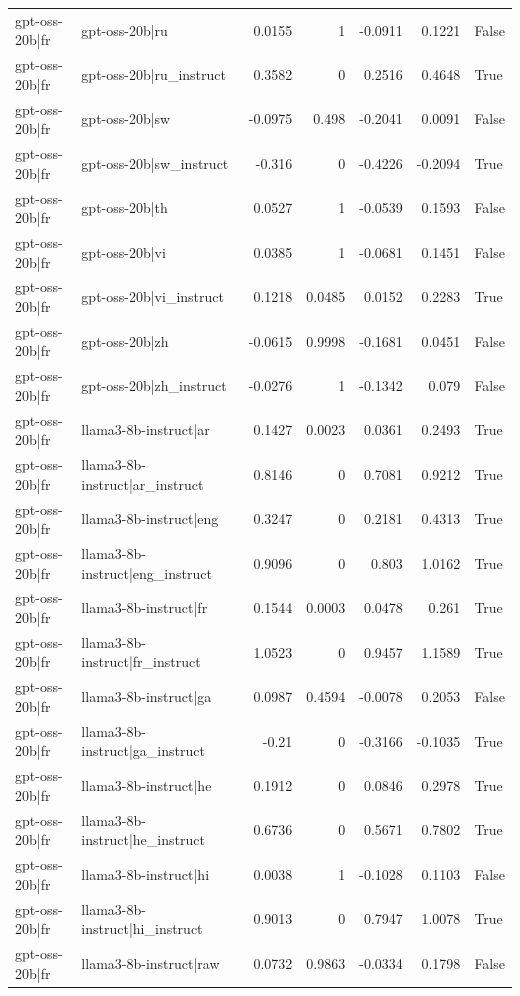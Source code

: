 \begin{table}
\begin{tabular}{l l r r r r l}
gpt-oss-20b|fr & gpt-oss-20b|ru & 0.0155 & 1 & -0.0911 & 0.1221 & False \\
gpt-oss-20b|fr & gpt-oss-20b|ru_instruct & 0.3582 & 0 & 0.2516 & 0.4648 & True \\
gpt-oss-20b|fr & gpt-oss-20b|sw & -0.0975 & 0.498 & -0.2041 & 0.0091 & False \\
gpt-oss-20b|fr & gpt-oss-20b|sw_instruct & -0.316 & 0 & -0.4226 & -0.2094 & True \\
gpt-oss-20b|fr & gpt-oss-20b|th & 0.0527 & 1 & -0.0539 & 0.1593 & False \\
gpt-oss-20b|fr & gpt-oss-20b|vi & 0.0385 & 1 & -0.0681 & 0.1451 & False \\
gpt-oss-20b|fr & gpt-oss-20b|vi_instruct & 0.1218 & 0.0485 & 0.0152 & 0.2283 & True \\
gpt-oss-20b|fr & gpt-oss-20b|zh & -0.0615 & 0.9998 & -0.1681 & 0.0451 & False \\
gpt-oss-20b|fr & gpt-oss-20b|zh_instruct & -0.0276 & 1 & -0.1342 & 0.079 & False \\
gpt-oss-20b|fr & llama3-8b-instruct|ar & 0.1427 & 0.0023 & 0.0361 & 0.2493 & True \\
gpt-oss-20b|fr & llama3-8b-instruct|ar_instruct & 0.8146 & 0 & 0.7081 & 0.9212 & True \\
gpt-oss-20b|fr & llama3-8b-instruct|eng & 0.3247 & 0 & 0.2181 & 0.4313 & True \\
gpt-oss-20b|fr & llama3-8b-instruct|eng_instruct & 0.9096 & 0 & 0.803 & 1.0162 & True \\
gpt-oss-20b|fr & llama3-8b-instruct|fr & 0.1544 & 0.0003 & 0.0478 & 0.261 & True \\
gpt-oss-20b|fr & llama3-8b-instruct|fr_instruct & 1.0523 & 0 & 0.9457 & 1.1589 & True \\
gpt-oss-20b|fr & llama3-8b-instruct|ga & 0.0987 & 0.4594 & -0.0078 & 0.2053 & False \\
gpt-oss-20b|fr & llama3-8b-instruct|ga_instruct & -0.21 & 0 & -0.3166 & -0.1035 & True \\
gpt-oss-20b|fr & llama3-8b-instruct|he & 0.1912 & 0 & 0.0846 & 0.2978 & True \\
gpt-oss-20b|fr & llama3-8b-instruct|he_instruct & 0.6736 & 0 & 0.5671 & 0.7802 & True \\
gpt-oss-20b|fr & llama3-8b-instruct|hi & 0.0038 & 1 & -0.1028 & 0.1103 & False \\
gpt-oss-20b|fr & llama3-8b-instruct|hi_instruct & 0.9013 & 0 & 0.7947 & 1.0078 & True \\
gpt-oss-20b|fr & llama3-8b-instruct|raw & 0.0732 & 0.9863 & -0.0334 & 0.1798 & False \\

\end{tabular}
\end{table}

